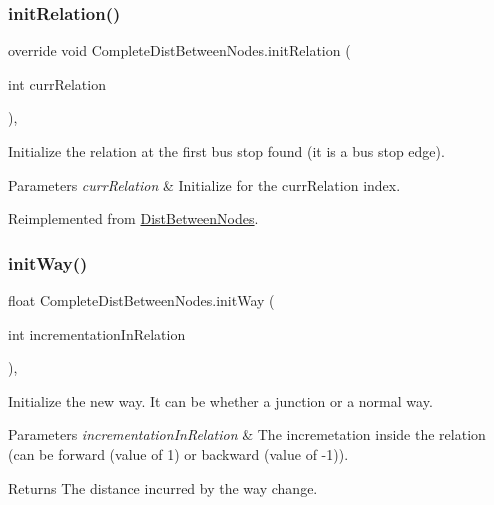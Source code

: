 \subsubsection{\texorpdfstring{init\+Relation()}{initRelation()}\hspace{0.1cm}{\footnotesize\ttfamily [2/2]}}
{\footnotesize\ttfamily override void Complete\+Dist\+Between\+Nodes.\+init\+Relation (\begin{DoxyParamCaption}\item[{int}]{curr\+Relation }\end{DoxyParamCaption})\hspace{0.3cm}{\ttfamily [inline]}, {\ttfamily [virtual]}}



Initialize the relation at the first bus stop found (it is a bus stop edge). 


\begin{DoxyParams}{Parameters}
{\em curr\+Relation} & Initialize for the \textquotesingle{}curr\+Relation\textquotesingle{} index.\\
\hline
\end{DoxyParams}


Reimplemented from \hyperlink{classDistBetweenNodes_a6a05019d7ec4797028e5e11611ff96d4}{Dist\+Between\+Nodes}.

\mbox{\label{classCompleteDistBetweenNodes_a8e0ef6259e490cec706aa321cac9856c}} 
\subsubsection{\texorpdfstring{init\+Way()}{initWay()}}
{\footnotesize\ttfamily float Complete\+Dist\+Between\+Nodes.\+init\+Way (\begin{DoxyParamCaption}\item[{int}]{incrementation\+In\+Relation }\end{DoxyParamCaption})\hspace{0.3cm}{\ttfamily [inline]}, {\ttfamily [private]}}



Initialize the new way. It can be whether a junction or a normal way. 


\begin{DoxyParams}{Parameters}
{\em incrementation\+In\+Relation} & The incremetation inside the relation (can be forward (value of 1) or backward (value of -\/1)).\\
\hline
\end{DoxyParams}
\begin{DoxyReturn}{Returns}
The distance incurred by the way change.
\end{DoxyReturn}
\mbox{\label{classCompleteDistBetweenNodes_adc80b5a016053730e411d703dfbff68f}} 
